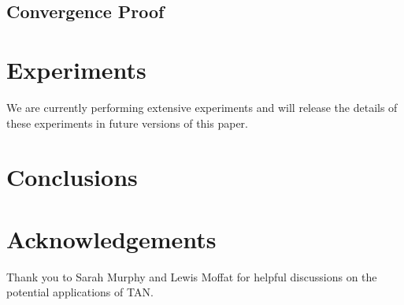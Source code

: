 \documentclass{article}
\begin{document}
\subsection{Convergence Proof}



\section{Experiments}
We are currently performing extensive experiments and will release the details of these experiments in future versions of this paper.
\section{Conclusions}

\section*{Acknowledgements}
Thank you to Sarah Murphy and Lewis Moffat for helpful discussions on the potential applications of TAN.




%
\end{document}
